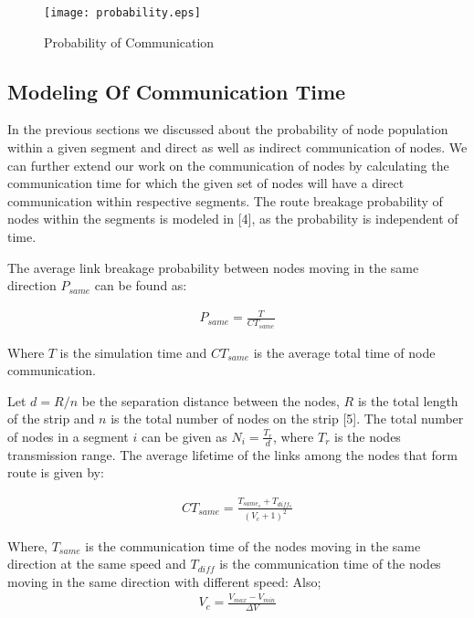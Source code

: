 \documentclass[journal]{IEEEtran}
\begin{document}
\begin{figure}[h]
\begin{center}
\texttt{[image: probability.eps]}
\caption{Probability of Communication}
\end{center}
\end{figure}
\vspace{-0.5cm}



\subsection{Modeling Of Communication Time}
In the previous sections we discussed about the probability of node population within a given segment and direct as well as indirect communication of nodes.
We can further extend our work on the communication of nodes by calculating the communication time for which the given set of nodes will have a direct communication within respective segments. The route breakage probability of nodes within the segments is modeled in [4], as the probability is independent of time.

The average link breakage probability between nodes moving in the same direction $ P_{same}$ can be found as:

\begin{eqnarray}
P_{same} = \frac{T}{CT_{same}}
\end{eqnarray}

Where $T$ is the simulation time and $ CT_{same} $ is the average total time of node communication.

Let $ d=R/n $ be the separation distance between the nodes, $R$ is the total length of the strip and $n$ is the total number of nodes on the strip [5]. The total number of nodes in a segment $i$ can be given as $ N_{i} = \frac{T_{r}}{d} $, where $ T_{r} $ is the nodes transmission range. The average lifetime of the links among the nodes that form route is given by:

\begin{eqnarray}
CT_{same} = \frac{T_{same_{s}} + T_{diff_{s}}}{(V_{c}+1)^2}
\end{eqnarray}

Where, $ T_{same} $ is the communication time of the nodes moving in the same direction at the same speed and $ T_{diff}$ is the communication time of the nodes moving in the same direction with different speed: Also;
\begin{eqnarray}
V_{c}=\frac{V_{max}-V_{min}}{\Delta{V}}
\end{eqnarray}
\end{document}
